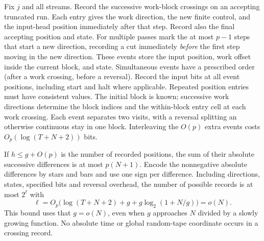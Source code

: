 \documentclass[11pt]{article}
\begin{document}
Fix $j$ and all streams. Record the successive work-block crossings on an accepting truncated run. Each entry gives the work direction, the new finite control, and the input-head position immediately after that step. Record also the final accepting position and state. For multiple passes mark the at most $p-1$ steps that start a new direction, recording a cut immediately \emph{before} the first step moving in the new direction. These events store the input position, work offset inside the current block, and state. Simultaneous events have a prescribed order (after a work crossing, before a reversal). Record the input bits at all event positions, including start and halt where applicable. Repeated position entries must have consistent values. The initial block is known; successive work directions determine the block indices and the within-block entry cell at each work crossing. Each event separates two visits, with a reversal splitting an otherwise continuous stay in one block. Interleaving the $O(p)$ extra events costs $O_p(\log(T+N+2))$ bits.

If $h\le g+O(p)$ is the number of recorded positions, the sum of their absolute successive differences is at most $p(N+1)$. Encode the nonnegative absolute differences by stars and bars and use one sign per difference. Including directions, states, specified bits and reversal overhead, the number of possible records is at most $2^\ell$ with
\[
 \ell=O_p\big(\log(T+N+2)+g+g\log_2(1+N/g)\big)=o(N).
\]
This bound uses that $g=o(N)$, even when $g$ approaches $N$ divided by a slowly growing function. No absolute time or global random-tape coordinate occurs in a crossing record.
\end{document}
